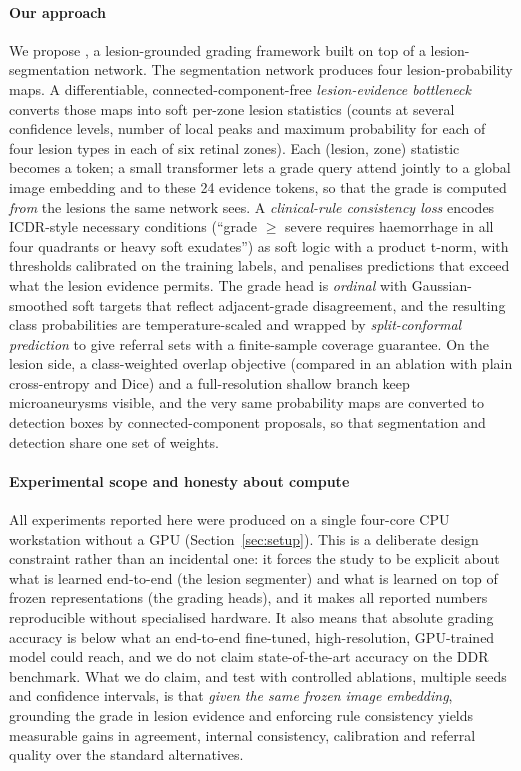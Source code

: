 \paragraph{Our approach} We propose \mname, a lesion-grounded grading framework built on top of a lesion-segmentation network. The segmentation network produces four lesion-probability maps. A differentiable, connected-component-free \emph{lesion-evidence bottleneck} converts those maps into soft per-zone lesion statistics (counts at several confidence levels, number of local peaks and maximum probability for each of four lesion types in each of six retinal zones). Each (lesion, zone) statistic becomes a token; a small transformer lets a grade query attend jointly to a global image embedding and to these 24 evidence tokens, so that the grade is computed \emph{from} the lesions the same network sees. A \emph{clinical-rule consistency loss} encodes ICDR-style necessary conditions (``grade $\ge$ severe requires haemorrhage in all four quadrants or heavy soft exudates'') as soft logic with a product t-norm, with thresholds calibrated on the training labels, and penalises predictions that exceed what the lesion evidence permits. The grade head is \emph{ordinal} with Gaussian-smoothed soft targets that reflect adjacent-grade disagreement, and the resulting class probabilities are temperature-scaled and wrapped by \emph{split-conformal prediction} to give referral sets with a finite-sample coverage guarantee. On the lesion side, a class-weighted overlap objective (compared in an ablation with plain cross-entropy and Dice) and a full-resolution shallow branch keep microaneurysms visible, and the very same probability maps are converted to detection boxes by connected-component proposals, so that segmentation and detection share one set of weights.

\paragraph{Experimental scope and honesty about compute} All experiments reported here were produced on a single four-core CPU workstation without a GPU (Section~\ref{sec:setup}). This is a deliberate design constraint rather than an incidental one: it forces the study to be explicit about what is learned end-to-end (the lesion segmenter) and what is learned on top of frozen representations (the grading heads), and it makes all reported numbers reproducible without specialised hardware. It also means that absolute grading accuracy is below what an end-to-end fine-tuned, high-resolution, GPU-trained model could reach, and we do not claim state-of-the-art accuracy on the DDR benchmark. What we do claim, and test with controlled ablations, multiple seeds and confidence intervals, is that \emph{given the same frozen image embedding}, grounding the grade in lesion evidence and enforcing rule consistency yields measurable gains in agreement, internal consistency, calibration and referral quality over the standard alternatives.

